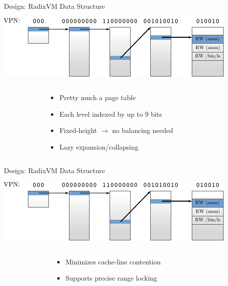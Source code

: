 \documentclass[aspectratio=169]{beamer}
\newcommand{\bi}{\begin{itemize}}
\newcommand{\ei}{\end{itemize}}
\begin{document}
\begin{frame}{Design: RadixVM Data Structure}
  \begin{center}
  \includegraphics[scale=1.5]{./figures/radix.pdf}
  \end{center}
  \begin{columns}[T]
    \begin{column}{0.2\textwidth}
    \end{column}
    \begin{column}{0.6\textwidth}
      \bi
    \item Pretty much a page table
      \pause
    \item Each level indexed by up to 9 bits
      \pause
    \item Fixed-height $\rightarrow$ no balancing needed
      \pause
    \item Lazy expansion/collapsing
      \ei
    \end{column}
    \begin{column}{0.2\textwidth}
    \end{column}
  \end{columns}
\end{frame}

\begin{frame}{Design: RadixVM Data Structure}
  \begin{center}
  \includegraphics[scale=1.5]{./figures/radix.pdf}
  \end{center}
  \begin{columns}[T]
    \begin{column}{0.2\textwidth}
    \end{column}
    \begin{column}{0.6\textwidth}
      \bi
    \item Minimizes cache-line contention
      \pause
    \item Supports precise range locking
      \ei
    \end{column}
    \begin{column}{0.2\textwidth}
    \end{column}
  \end{columns}
\end{frame}
\end{document}
